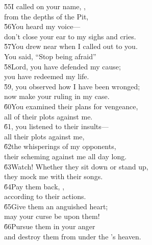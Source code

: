 \begin{poetry}
\poeml \v{55}I called on your name, , \\
\poemll    from the depths of the Pit, \\
\poeml \v{56}You heard my voice--- \\
\poemll    don't close your ear to my sighs and cries. \\
\poeml \v{57}You drew near when I called out to you. \\
\poemll    You said, ``Stop being afraid'' \\
\poeml \v{58}Lord, you have defended my cause; \\
\poemll    you have redeemed my life. \\
\poeml \v{59}, you observed how I have been wronged; \\
\poemll    now make your ruling in my case. \\
\poeml \v{60}You examined their plans for vengeance, \\
\poemll    all of their plots against me. \\
\poeml \v{61}, you listened to their insults--- \\
\poemll    all their plots against me, \\
\poeml \v{62}the whisperings of my opponents, \\
\poemll    their scheming against me all day long. \\
\poeml \v{63}Watch! Whether they sit down or stand up, \\
\poemll    they mock me with their songs. \\
\poeml \v{64}Pay them back, , \\
\poemll    according to their actions. \\
\poeml \v{65}Give them an anguished heart; \\
\poemll    may your curse be upon them! \\
\poeml \v{66}Pursue them in your anger \\
\poemll    and destroy them from under the 's heaven.
\end{poetry}


